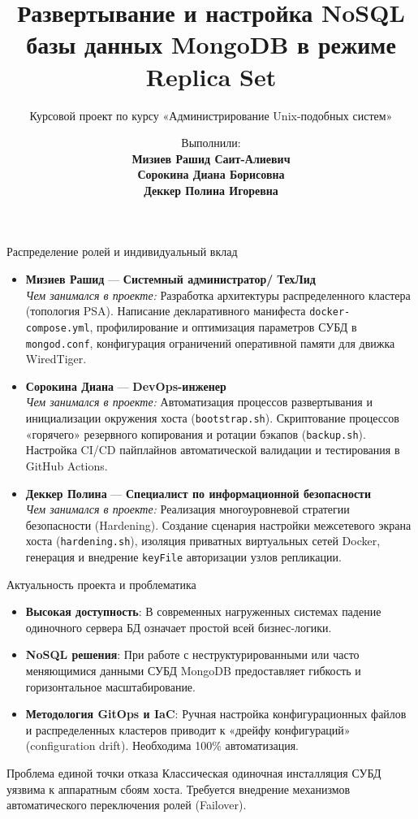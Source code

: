 \documentclass[10pt]{beamer}
\title[СУБД MongoDB]{Развертывание и настройка NoSQL базы данных MongoDB в режиме Replica Set}
\subtitle{Курсовой проект по курсу «Администрирование Unix-подобных систем»}
\author[Мизиев Р. С.]{Выполнили: \\ \textbf{Мизиев Рашид Саит-Алиевич} \\ \textbf{Сорокина Диана Борисовна} \\ \textbf{Деккер Полина Игоревна}}
\institute[ЮФУ]{Южный федеральный уни1верситет \\ Физический факультет}
\date{\the\year}
\begin{document}
	
	\begin{frame}
		\titlepage
	\end{frame}
	
	\begin{frame}{Распределение ролей и индивидуальный вклад}
		\begin{itemize}
			\item \textbf{Мизиев Рашид} — \textbf{Системный администратор/ ТехЛид} \\ 
			\textit{Чем занимался в проекте:} Разработка архитектуры распределенного кластера (топология PSA). Написание декларативного манифеста \texttt{docker-compose.yml}, профилирование и оптимизация параметров СУБД в \texttt{mongod.conf}, конфигурация ограничений оперативной памяти для движка WiredTiger.
			\vfill
			\item \textbf{Сорокина Диана} — \textbf{DevOps-инженер} \\ 
			\textit{Чем занимался в проекте:} Автоматизация процессов развертывания и инициализации окружения хоста (\texttt{bootstrap.sh}). Скриптование процессов «горячего» резервного копирования и ротации бэкапов (\texttt{backup.sh}). Настройка CI/CD пайплайнов автоматической валидации и тестирования в GitHub Actions.
			\vfill
			\item \textbf{Деккер Полина} — \textbf{Специалист по информационной безопасности} \\ 
			\textit{Чем занимался в проекте:} Реализация многоуровневой стратегии безопасности (Hardening). Создание сценария настройки межсетевого экрана хоста (\texttt{hardening.sh}), изоляция приватных виртуальных сетей Docker, генерация и внедрение \texttt{keyFile} авторизации узлов репликации.
		\end{itemize}
	\end{frame}
	
	\begin{frame}{Актуальность проекта и проблематика}
		\begin{itemize}
			\item \textbf{Высокая доступность}: В современных нагруженных системах падение одиночного сервера БД означает простой всей бизнес-логики.
			\item \textbf{NoSQL решения}: При работе с неструктурированными или часто меняющимися данными СУБД MongoDB предоставляет гибкость и горизонтальное масштабирование.
			\item \textbf{Методология GitOps и IaC}: Ручная настройка конфигурационных файлов и распределенных кластеров приводит к «дрейфу конфигураций» (configuration drift). Необходима 100\% автоматизация.
		\end{itemize}
		\vfill
		\begin{block}{Проблема единой точки отказа}
			Классическая одиночная инсталляция СУБД уязвима к аппаратным сбоям хоста. Требуется внедрение механизмов автоматического переключения ролей (Failover).
		\end{block}
	\end{frame}
	
\end{document}
